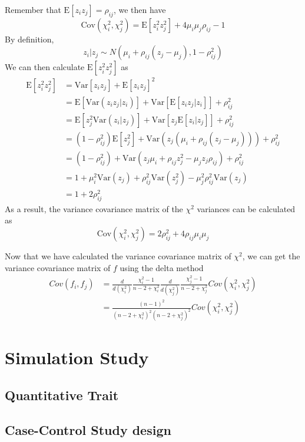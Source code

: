 \documentclass{book}
\begin{document}
			Remember that $\mathrm{E}[z_iz_j] = \rho_{ij}$, we then have
			$$
			\mathrm{Cov}(\chi_i^2, \chi_j^2)=\mathrm{E}[z_i^2z_j^2]+4\mu_i\mu_j\rho_{ij}-1
			$$
			By definition, 
			$$
				z_i|z_j\sim N(\mu_i+\rho_{ij}(z_j-\mu_j),1-\rho_{ij}^2)
			$$
			We can then calculate $\mathrm{E}[z_i^2z_j^2]$ as
			\begin{align*}
				\mathrm{E}[z_i^2z_j^2]&=\mathrm{Var}[z_iz_j]+\mathrm{E}[z_iz_j]^2\\
				&=\mathrm{E}[\mathrm{Var}(z_iz_j|z_i)]+\mathrm{Var}[\mathrm{E}[z_iz_j|z_i]]+\rho_{ij}^2\\
				&=\mathrm{E}[z_j^2\mathrm{Var}(z_i|z_j)]+\mathrm{Var}[z_j\mathrm{E}[z_i|z_j]]+\rho_{ij}^2\\
				&=(1-\rho_{ij}^2)\mathrm{E}[z_j^2]+\mathrm{Var}(z_j(\mu_i+\rho_{ij}(z_j-\mu_j)))+\rho_{ij}^2\\
				&=(1-\rho_{ij}^2)+\mathrm{Var}(z_j\mu_i+\rho_{ij}z_j^2-\mu_jz_j\rho_{ij})+\rho_{ij}^2\\
				&=1+\mu_i^2\mathrm{Var}(z_j)+\rho_{ij}^2\mathrm{Var}(z_j^2)-\mu_j^2\rho_{ij}^2\mathrm{Var}(z_j)\\
				&=1+2\rho_{ij}^2
			\end{align*}
			As a result, the variance covariance matrix of the $\chi^2$ variances can be calculated as
			$$
				\mathrm{Cov}(\chi_i^2,\chi_j^2) = 2\rho_{ij}^2+4\rho_{ij}\mu_i\mu_j
			$$

			Now that we have calculated the variance covariance matrix of $\chi^2$, we can get the variance covariance matrix of $f$ using the delta method
			\begin{align*}
			Cov(f_i,f_j) &= \frac{d}{d(\chi_i^2)}\frac{\chi_i^2-1}{n-2+\chi_i^2}\frac{d}{d(\chi_j^2)}\frac{\chi_j^2-1}{n-2+\chi_j^2}Cov(\chi_i^2,\chi_j^2) \\
			&= \frac{(n-1)^2}{(n-2+\chi_i^2)^2(n-2+\chi_j^2)^2}Cov(\chi_i^2,\chi_j^2)
			\end{align*}
		\section{Simulation Study}
			\subsection{Quantitative Trait}
			\subsection{Case-Control Study design}
\end{document}
